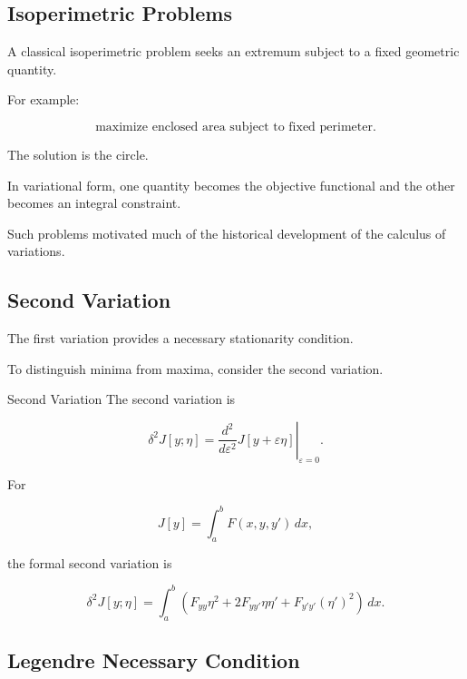\subsection{Isoperimetric Problems}
\label{subsec:isoperimetric-problems}

A classical isoperimetric problem seeks an extremum subject to a fixed
geometric quantity.

For example:

\[
\boxed{
\text{maximize enclosed area subject to fixed perimeter}.
}
\]

The solution is the circle.

In variational form, one quantity becomes the objective functional and
the other becomes an integral constraint.

Such problems motivated much of the historical development of the
calculus of variations.

\subsection{Second Variation}
\label{subsec:second-variation}

The first variation provides a necessary stationarity condition.

To distinguish minima from maxima, consider the second variation.

\begin{definitionbox}{Second Variation}
The second variation is

\[
\boxed{
\delta^2J[y;\eta]
=
\left.
\frac{d^2}{d\varepsilon^2}
J[y+\varepsilon\eta]
\right|_{\varepsilon=0}.
}
\]
\end{definitionbox}

For

\[
J[y]
=
\int_a^b
F(x,y,y')\,dx,
\]

the formal second variation is

\[
\boxed{
\delta^2J[y;\eta]
=
\int_a^b
\left(
F_{yy}\eta^2
+
2F_{yy'}\eta\eta'
+
F_{y'y'}(\eta')^2
\right)\,dx.
}
\]

\subsection{Legendre Necessary Condition}
\label{subsec:legendre-condition}

